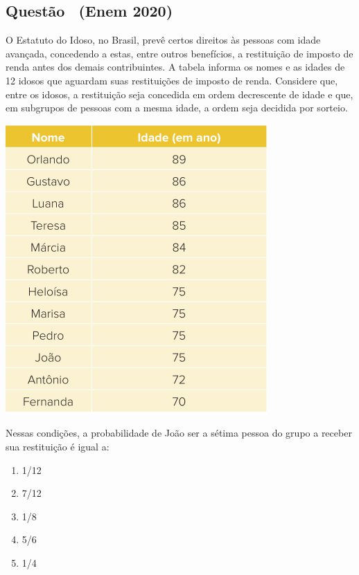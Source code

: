 \documentclass[12pt]{article}
\newcounter{questao}
\newcommand{\novaquestao}[1]{%
  \stepcounter{questao}%
  \subsection*{Questão \thequestao\ (#1)}%
}
\begin{document}
\begin{multicols}{2}
        \novaquestao{Enem 2020}

            O Estatuto do Idoso, no Brasil, prevê certos direitos às pessoas com idade 
            avançada, concedendo a estas, entre outros benefícios, a restituição de imposto 
            de renda antes dos demais contribuintes. A tabela informa os nomes e as idades de 
            12 idosos que aguardam suas restituições de imposto de renda. Considere que, 
            entre os idosos, a restituição seja concedida em ordem decrescente de idade e que,
            em subgrupos de pessoas com a mesma idade, a ordem seja decidida por sorteio.

            \begin{center}
                \includegraphics[scale=0.6]{imagens/enem-2020.png}
            \end{center} Nessas condições, a probabilidade de João ser a sétima pessoa do 
            grupo a receber sua restituição é igual a:

            \begin{enumerate}[label=(\alph*), noitemsep]
                \item {1}/{12}
                \item {7}/{12}
                \item {1}/{8}
                \item {5}/{6}
                \item {1}/{4}
            \end{enumerate}
        

\end{multicols}
\end{document}
